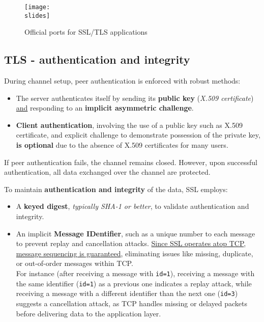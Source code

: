 \begin{figure}[h]
    \centering
    \texttt{[image: \\slides]}
    \caption{Official ports for SSL/TLS applications}
\end{figure}


\subsection{TLS - authentication and integrity}
During channel setup, peer authentication is enforced with robust methods:

\begin{itemize}
    \item The server authenticates itself by sending its \textbf{public key} (\textit{X.509 certificate}) \underline{and} responding to an \textbf{implicit asymmetric challenge}.
    \item \textbf{Client authentication}, involving the use of a public key such as X.509 certificate, and explicit challenge to demonstrate possession of the private key, \textbf{is optional} due to the absence of X.509 certificates for many users.
\end{itemize}
If peer authentication fails, the channel remains closed. However, upon successful authentication, all data exchanged over the channel are protected.

To maintain \textbf{authentication and integrity} of the data, SSL employs:
\begin{itemize}
    \item A \textbf{keyed digest}, \textit{typically SHA-1 or better}, to validate authentication and integrity.
    \item An implicit \textbf{Message IDentifier}, such as a unique number to each message to prevent replay and cancellation attacks. \ul{Since SSL operates atop TCP}, \ul{message sequencing is guaranteed}, eliminating issues like missing, duplicate, or out-of-order messages within TCP.\\
          For instance (after receiving a message with \texttt{id=1}), receiving a message with the same identifier (\texttt{id=1}) as a previous one indicates a replay attack, while receiving a message with a different identifier than the next one (\texttt{id=3}) suggests a cancellation attack, as TCP handles missing or delayed packets before delivering data to the application layer.
\end{itemize}



